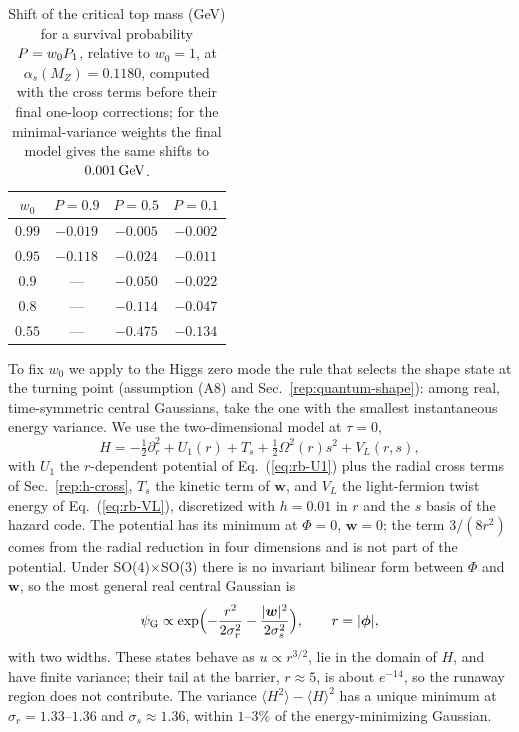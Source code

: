 \begin{table}[t]
\centering
\caption{Shift of the critical top mass (GeV) for a survival probability $P=w_0P_1$, relative to $w_0=1$, at $\alpha_s(M_Z)=0.1180$, computed with the cross terms before their final one-loop corrections; for the minimal-variance weights the final model gives the same shifts to $0.001\,\mathrm{GeV}$.} %
\label{tab:rb-w0}
\begin{tabular}{cccc}
\toprule
$w_0$ & $P=0.9$ & $P=0.5$ & $P=0.1$ \\
\midrule
$0.99$ & $-0.019$ & $-0.005$ & $-0.002$ \\ %
$0.95$ & $-0.118$ & $-0.024$ & $-0.011$ \\ %
$0.9$ & --- & $-0.050$ & $-0.022$ \\ %
$0.8$ & --- & $-0.114$ & $-0.047$ \\ %
$0.55$ & --- & $-0.475$ & $-0.134$ \\ %
\bottomrule
\end{tabular}
\end{table}

To fix $w_0$ we apply to the Higgs zero mode the rule that selects the shape state at the turning point (assumption (A8) and Sec.~\ref{rep:quantum-shape}): among real, time-symmetric central Gaussians, take the one with the smallest instantaneous energy variance.
We use the two-dimensional model at $\tau=0$,
\begin{equation}
H=-\tfrac12\partial_r^2+U_1(r)+T_s+\tfrac12\Omega^2(r)s^2+V_L(r,s),
\label{eq:rb-H-B3}
\end{equation}
with $U_1$ the $r$-dependent potential of Eq.~(\ref{eq:rb-U1}) plus the radial cross terms of Sec.~\ref{rep:h-cross}, $T_s$ the kinetic term of $\bm w$, and $V_L$ the light-fermion twist energy of Eq.~(\ref{eq:rb-VL}), discretized with $h=0.01$ in $r$ and the $s$ basis of the hazard code. %
The potential has its minimum at $\Phi=0$, $\bm w=0$; the term $3/(8r^2)$ comes from the radial reduction in four dimensions and is not part of the potential.
Under SO(4)$\times$SO(3) there is no invariant bilinear form between $\Phi$ and $\bm w$, so the most general real central Gaussian is
\begin{equation}
\psi_{\rm G}\propto\exp\Bigl(-\frac{r^2}{2\sigma_r^2}-\frac{|\bm w|^2}{2\sigma_s^2}\Bigr),\qquad r=|\bm\phi|,
\label{eq:rb-B3}
\end{equation}
with two widths.
These states behave as $u\propto r^{3/2}$, lie in the domain of $H$, and have finite variance; their tail at the barrier, $r\approx5$, is about $e^{-14}$, so the runaway region does not contribute. %
The variance $\langle H^2\rangle-\langle H\rangle^2$ has a unique minimum at $\sigma_r=1.33$--$1.36$ and $\sigma_s\approx1.36$, within $1$--$3\%$ of the energy-minimizing Gaussian. %

